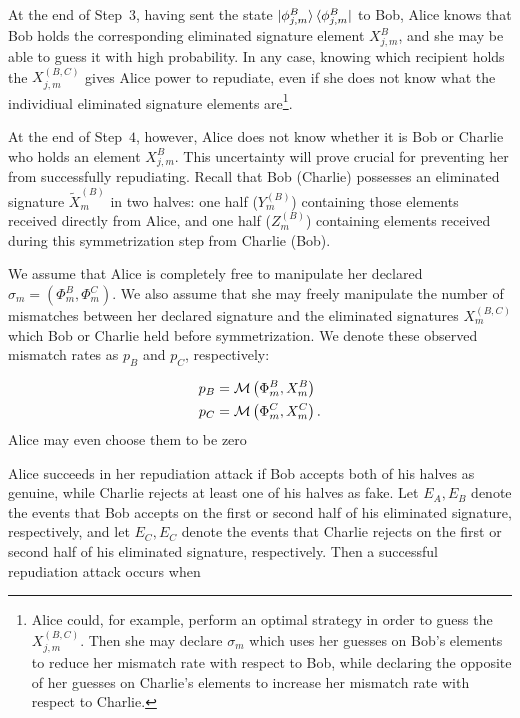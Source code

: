 At the end of Step~$3$, having sent the state $\ket{\phi_{j, m}^B}\bra{\phi_{j, m}^B}$ to Bob, Alice knows that Bob holds the corresponding eliminated signature element $X_{j, m}^B$, and she may be able to guess it with high probability. In any case, knowing which recipient holds the $X_{j, m}^{\left(B, C\right)}$ gives Alice power to repudiate, even if she does not know what the individiual eliminated signature elements are\footnote{Alice could, for example, perform an optimal strategy in order to guess the $X_{j, m}^{\left(B, C\right)}$. Then she may declare $\sigma_m$ which uses her guesses on Bob's elements to reduce her mismatch rate with respect to Bob, while declaring the opposite of her guesses on Charlie's elements to increase her mismatch rate with respect to Charlie.}.

At the end of Step~$4$, however, Alice does not know whether it is Bob or Charlie who holds an element $X_{j, m}^B$. This uncertainty will prove crucial for preventing her from successfully repudiating. Recall that Bob  (Charlie) possesses an eliminated signature $\tilde{X}_m^{\left(B\right)}$ in two halves: one half ($Y_m^{\left(B\right)}$) containing those elements received directly from Alice, and one half ($Z_m^{\left(B\right)}$) containing elements received during this symmetrization step from Charlie (Bob).

We assume that Alice is completely free to manipulate her declared $\sigma_m = \left(\Phi_m^B, \Phi_m^C\right)$. We also assume that she may freely manipulate the number of mismatches %
between her declared signature and the eliminated signatures $X_m^{\left(B, C\right)}$ which Bob or Charlie held before symmetrization. We denote these observed mismatch rates as $p_B$ and $p_C$, respectively: 

\begin{align}
p_B &= \mathcal{M}\left(\Phi_m^B, X_m^B\right) \notag \\
p_C &= \mathcal{M}\left(\Phi_m^C, X_m^C\right).
\end{align}
Alice may even choose them to be zero


Alice succeeds in her repudiation attack if Bob accepts both of his halves as genuine, while Charlie rejects at least one of his halves as fake. Let $E_A, E_B$ denote the events that Bob accepts on the first or second half of his eliminated signature, respectively, and let $E_C, E_C$ denote the events that Charlie rejects on the first or second half of his eliminated signature, respectively. Then a successful repudiation attack occurs when

